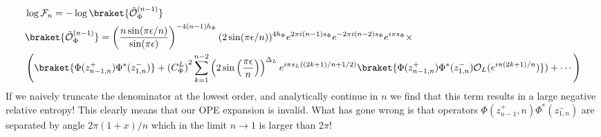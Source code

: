 \documentclass[11pt]{article}
\newcommand{\ep}{\epsilon}
\newcommand{\mO}{\mathcal{O}}
\newcommand{\nn}{\nonumber}
\newcommand{\lb}{\left(}
\newcommand{\rb}{\right)}
\newcommand{\JM}[1]{\textcolor{orange}{#1}}
\begin{document}
\begin{align}
  &\log\mathcal{F}_n=-\log\braket{\tilde{\mO}_{\Phi}^{(n-1)}}\nn \\
&\braket{\tilde{\mO}_{\Phi}^{(n-1)}}=\lb \frac{n \sin(\pi\ep/n)}{\sin(\pi\ep)}\rb^{-4(n-1)h_\Phi}(2\sin(\pi\ep/n))^{4h_\Phi}e^{2\pi i(n-1)s_\Phi  }e^{-2\pi i(n-2) s_\Phi}e^{i\pi s_\Phi}\times \nn\\
&\lb\braket{\Phi(z^+_{n-1,n})\Phi^*(z^-_{1,n})}+{(C_\Phi^L)}^2 \sum_{k=1}^{n-2} \lb 2\sin\lb\frac{\pi\epsilon}{n}\rb\rb^{\Delta_L}e^{i\pi s_L((2k+1)/n + 1/2)}\braket{\Phi(z^+_{n-1,n})\Phi^*(z^-_{1,n}) \mO_L(e^{i\pi (2k+1)/n})})+\cdots\rb
\end{align}
If we naively truncate the denominator at the lowest order, and analytically continue in $n$ we find that this term results in a large negative relative entropy! This clearly means that our OPE expansion is invalid. What has gone wrong is that operators $\Phi(z^+_{n-1},n)\Phi^*(z^-_{1,n})$ are separated by angle $2\pi(1+x)/n$ which in the limit $n\to 1$ is larger than $2\pi$! 
\end{document}
